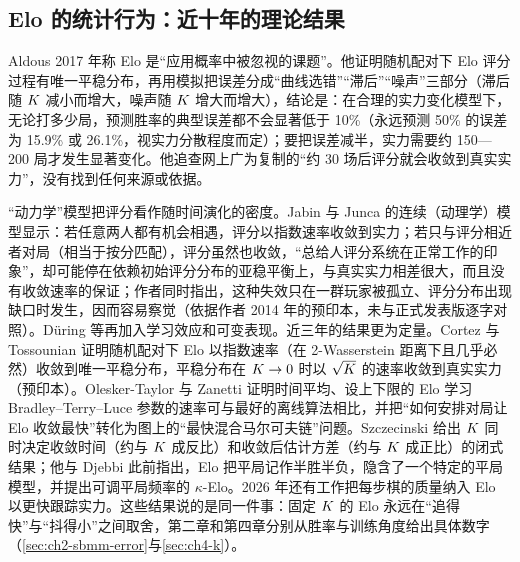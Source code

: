 \subsection{Elo 的统计行为：近十年的理论结果}\label{sec:1a-theory}

Aldous 2017 年称 Elo 是“应用概率中被忽视的课题”\cite{aldous2017elo}\tagLit。他证明随机配对下 Elo 评分过程有唯一平稳分布，再用模拟把误差分成“曲线选错”“滞后”“噪声”三部分（滞后随 $K$ 减小而增大，噪声随 $K$ 增大而增大），结论是：在合理的实力变化模型下，无论打多少局，预测胜率的典型误差都不会显著低于 10\%（永远预测 50\% 的误差为 15.9\% 或 26.1\%，视实力分散程度而定）；要把误差减半，实力需要约 150—200 局才发生显著变化。他追查网上广为复制的“约 30 场后评分就会收敛到真实实力”，没有找到任何来源或依据。

“动力学”模型把评分看作随时间演化的密度。Jabin 与 Junca 的连续（动理学）模型显示：若任意两人都有机会相遇，评分以指数速率收敛到实力；若只与评分相近者对局（相当于按分匹配），评分虽然也收敛，“总给人评分系统在正常工作的印象”，却可能停在依赖初始评分分布的亚稳平衡上，与真实实力相差很大，而且没有收敛速率的保证；作者同时指出，这种失效只在一群玩家被孤立、评分分布出现缺口时发生，因而容易察觉\cite{jabin2015continuous}\tagLit（依据作者 2014 年的预印本，未与正式发表版逐字对照）。Düring 等再加入学习效应和可变表现\cite{during2019boltzmann,during2022elo}\tagLit。近三年的结果更为定量。Cortez 与 Tossounian 证明随机配对下 Elo 以指数速率（在 2-Wasserstein 距离下且几乎必然）收敛到唯一平稳分布，平稳分布在 $K\to0$ 时以 $\sqrt{K}$ 的速率收敛到真实实力（预印本）\cite{cortez2024convergence}\tagLit。Olesker-Taylor 与 Zanetti 证明时间平均、设上下限的 Elo 学习 Bradley–Terry–Luce 参数的速率可与最好的离线算法相比，并把“如何安排对局让 Elo 收敛最快”转化为图上的“最快混合马尔可夫链”问题\cite{oleskertaylor2024analysis}\tagLit。Szczecinski 给出 $K$ 同时决定收敛时间（约与 $K$ 成反比）和收敛后估计方差（约与 $K$ 成正比）的闭式结果\cite{szczecinski2026new}\tagLit；他与 Djebbi 此前指出，Elo 把平局记作半胜半负，隐含了一个特定的平局模型，并提出可调平局频率的 $\kappa$-Elo\cite{szczecinski2019understanding}\tagLit。2026 年还有工作把每步棋的质量纳入 Elo 以更快跟踪实力\cite{zhou2026accelerating}\tagLit。这些结果说的是同一件事：固定 $K$ 的 Elo 永远在“追得快”与“抖得小”之间取舍，第二章和第四章分别从胜率与训练角度给出具体数字（\cref{sec:ch2-sbmm-error}与\cref{sec:ch4-k}）。

